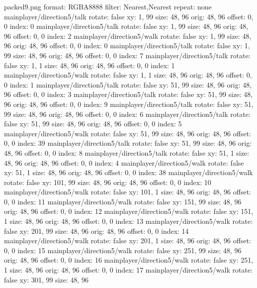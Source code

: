 packed9.png
format: RGBA8888
filter: Nearest,Nearest
repeat: none
mainplayer/direction5/talk
  rotate: false
  xy: 1, 99
  size: 48, 96
  orig: 48, 96
  offset: 0, 0
  index: 0
mainplayer/direction5/talk
  rotate: false
  xy: 1, 99
  size: 48, 96
  orig: 48, 96
  offset: 0, 0
  index: 2
mainplayer/direction5/walk
  rotate: false
  xy: 1, 99
  size: 48, 96
  orig: 48, 96
  offset: 0, 0
  index: 0
mainplayer/direction5/talk
  rotate: false
  xy: 1, 99
  size: 48, 96
  orig: 48, 96
  offset: 0, 0
  index: 7
mainplayer/direction5/talk
  rotate: false
  xy: 1, 1
  size: 48, 96
  orig: 48, 96
  offset: 0, 0
  index: 1
mainplayer/direction5/walk
  rotate: false
  xy: 1, 1
  size: 48, 96
  orig: 48, 96
  offset: 0, 0
  index: 1
mainplayer/direction5/talk
  rotate: false
  xy: 51, 99
  size: 48, 96
  orig: 48, 96
  offset: 0, 0
  index: 3
mainplayer/direction5/talk
  rotate: false
  xy: 51, 99
  size: 48, 96
  orig: 48, 96
  offset: 0, 0
  index: 9
mainplayer/direction5/talk
  rotate: false
  xy: 51, 99
  size: 48, 96
  orig: 48, 96
  offset: 0, 0
  index: 6
mainplayer/direction5/talk
  rotate: false
  xy: 51, 99
  size: 48, 96
  orig: 48, 96
  offset: 0, 0
  index: 5
mainplayer/direction5/walk
  rotate: false
  xy: 51, 99
  size: 48, 96
  orig: 48, 96
  offset: 0, 0
  index: 39
mainplayer/direction5/talk
  rotate: false
  xy: 51, 99
  size: 48, 96
  orig: 48, 96
  offset: 0, 0
  index: 8
mainplayer/direction5/talk
  rotate: false
  xy: 51, 1
  size: 48, 96
  orig: 48, 96
  offset: 0, 0
  index: 4
mainplayer/direction5/walk
  rotate: false
  xy: 51, 1
  size: 48, 96
  orig: 48, 96
  offset: 0, 0
  index: 38
mainplayer/direction5/walk
  rotate: false
  xy: 101, 99
  size: 48, 96
  orig: 48, 96
  offset: 0, 0
  index: 10
mainplayer/direction5/walk
  rotate: false
  xy: 101, 1
  size: 48, 96
  orig: 48, 96
  offset: 0, 0
  index: 11
mainplayer/direction5/walk
  rotate: false
  xy: 151, 99
  size: 48, 96
  orig: 48, 96
  offset: 0, 0
  index: 12
mainplayer/direction5/walk
  rotate: false
  xy: 151, 1
  size: 48, 96
  orig: 48, 96
  offset: 0, 0
  index: 13
mainplayer/direction5/walk
  rotate: false
  xy: 201, 99
  size: 48, 96
  orig: 48, 96
  offset: 0, 0
  index: 14
mainplayer/direction5/walk
  rotate: false
  xy: 201, 1
  size: 48, 96
  orig: 48, 96
  offset: 0, 0
  index: 15
mainplayer/direction5/walk
  rotate: false
  xy: 251, 99
  size: 48, 96
  orig: 48, 96
  offset: 0, 0
  index: 16
mainplayer/direction5/walk
  rotate: false
  xy: 251, 1
  size: 48, 96
  orig: 48, 96
  offset: 0, 0
  index: 17
mainplayer/direction5/walk
  rotate: false
  xy: 301, 99
  size: 48, 96
